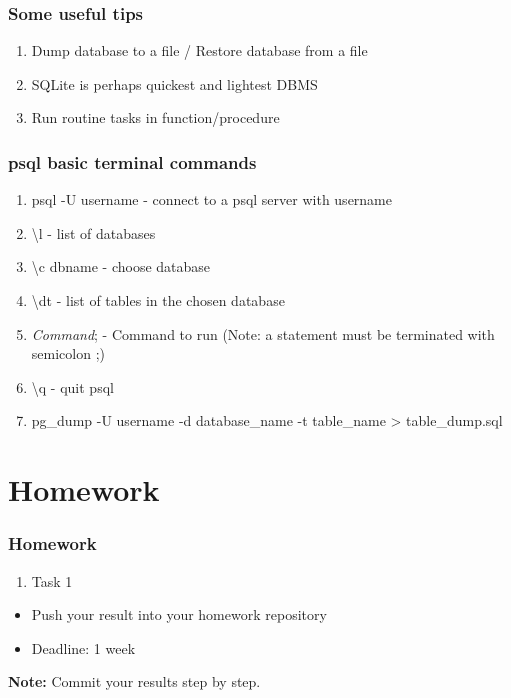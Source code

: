 \documentclass{beamer}
\begin{document}
\begin{frame}
    \frametitle{Some useful tips}
    \begin{enumerate}
        \item Dump database to a file / Restore database from a file
        \item SQLite is perhaps quickest and lightest DBMS 
        \item Run routine tasks in function/procedure
    \end{enumerate}
\end{frame}

\begin{frame}
    \frametitle{psql basic terminal commands}
    \begin{enumerate}
        \item psql -U username - connect to a psql server with username
        \item \textbackslash l - list of databases 
        \item \textbackslash c dbname - choose database
        \item \textbackslash dt - list of tables in the chosen database 
        \item \textit{Command}; - Command to run (Note: a statement must be terminated with semicolon ;)
        \item \textbackslash q - quit psql
        \item pg_dump -U username -d database_name -t table_name > table_dump.sql

    \end{enumerate}
\end{frame}

\section{Homework} 

\begin{frame}
    \frametitle{Homework}
    \begin{enumerate}
        \item Task 1
    \end{enumerate}

    \vskip 2mm
    \begin{itemize}
        \item Push your result into your homework repository
        \item Deadline: 1 week %
    \end{itemize}

\vfill
\textbf{Note:} Commit your results step by step.
\end{frame}
\end{document}
